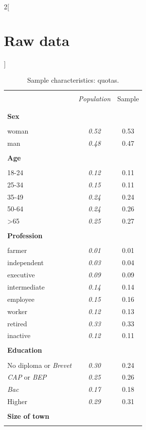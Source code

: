 \documentclass[12pt]{article} %
\renewcommand{\arraystretch}{0.73}
\def\arraystretch{1.15} %
\begin{document}
\newpage
{}
\begin{appendices}

\begin{multicols}{2}[\section{Raw data\label{sec:Raw-Data}}]

\renewcommand{\arraystretch}{0.80}

\begin{minipage}[t]{.45\textwidth}
\vspace{-1cm}
\begin{table}[H]
\label{table:sample_characteristics}
\caption{\label{tab:Sample-Characteristics}Sample characteristics: quotas.}
\centering
\begin{tabular}{lcc}
\hline \hline  \\[-1.8ex]
 & \emph{Population} & Sample  \tabularnewline \\[-1.8ex]
\hline  \\[-1.8ex]
\textbf{Sex} & & \tabularnewline  \\[-1.8ex]
woman & \emph{0.52} & 0.53\tabularnewline
man & \emph{0.48} & 0.47\tabularnewline
\hline \\[-1.8ex]
\textbf{Age} &  & \tabularnewline  \\[-1.8ex]
18-24 & \emph{0.12} & 0.11\tabularnewline
25-34 & \emph{0.15} & 0.11\tabularnewline
35-49 & \emph{0.24} & 0.24\tabularnewline
50-64 & \emph{0.24} & 0.26\tabularnewline
>65 & \emph{0.25} & 0.27\tabularnewline
\hline \\[-1.8ex]
\textbf{Profession} &  & \tabularnewline  \\[-1.8ex]
farmer & \emph{0.01} & 0.01\tabularnewline
independent & \emph{0.03} & 0.04\tabularnewline
executive & \emph{0.09} & 0.09\tabularnewline
intermediate & \emph{0.14} & 0.14\tabularnewline
employee & \emph{0.15} & 0.16\tabularnewline
worker & \emph{0.12} & 0.13\tabularnewline
retired & \emph{0.33} & 0.33\tabularnewline
inactive & \emph{0.12} & 0.11\tabularnewline
\hline  \\[-1.8ex]
\textbf{Education} &  & \tabularnewline  \\[-1.8ex]
No diploma or \emph{Brevet} & \emph{0.30} & 0.24\tabularnewline
\emph{CAP} or \emph{BEP} & \emph{0.25} & 0.26\tabularnewline
\emph{Bac} & \emph{0.17} & 0.18\tabularnewline
Higher & \emph{0.29} & 0.31\tabularnewline
\hline  \\[-1.8ex]
\textbf{Size of town} &  & \tabularnewline  \\[-1.8ex]

\end{tabular}
\end{table}
\end{minipage}
\end{multicols}
\end{appendices}
\end{document}
